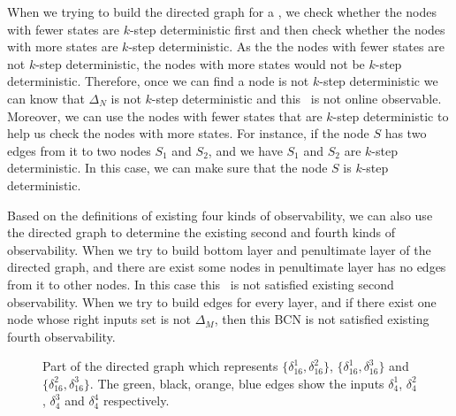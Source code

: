 When we trying to build the directed graph for a \BCN, we check whether the nodes with fewer states are $k$-step deterministic first and then check whether the nodes with more states are $k$-step deterministic.  As the the nodes with fewer states are not $k$-step deterministic, the nodes with more states would not be $k$-step deterministic. Therefore, once we can find a node is not $k$-step deterministic we can know that $\Delta_N$ is not $k$-step deterministic and this \BCN\ is not online observable. Moreover, we can use the nodes with fewer states that are $k$-step deterministic to help us check the nodes with more states. For instance, if the node $S$ has two edges from it to two nodes $S_1$ and $S_2$, and we have $S_1$ and $S_2$ are $k$-step deterministic. In this case, we can make sure that the node $S$ is $k$-step deterministic.

Based on the definitions of existing four kinds of observability, we can also use the directed graph to determine the existing second and fourth kinds of observability. When we try to build bottom layer and penultimate layer of the directed graph, and there are exist some nodes in penultimate layer has no edges from it to other nodes. In this case this \BCN\ is not satisfied existing second observability. When we try to build edges for every layer, and if there exist one node whose right inputs set is not $\Delta_M$, then this BCN is not satisfied existing fourth observability.
\begin{figure}[thpb]
      \centering
      
      \caption{Part of the directed graph which represents $\{\delta_{16}^1,\delta_{16}^2\}$, $\{\delta_{16}^1,\delta_{16}^3\}$ and $\{\delta_{16}^2,\delta_{16}^3\}$. The green, black, orange, blue edges show the inputs $\delta_4^1$, $\delta_4^2$, $\delta_4^3$ and $\delta_4^4$ respectively.}
      \label{fig:4}
   \end{figure}
